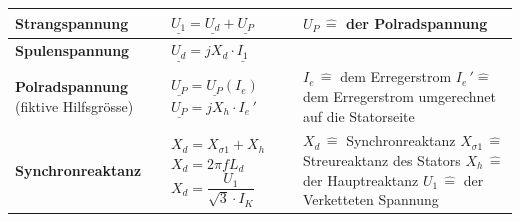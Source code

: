     \begin{longtable}[b]{| C{5cm}| P{8.5cm} | P{5 cm} |}
    	\hline
        \textbf{Strangspannung} 	&
        $\underline{U_1\!} = \underline{U_d\!} + \underline{U_P\!}$ &
        $U_P \, \widehat{=}$ der Polradspannung
        \\ \hline
        
        \textbf{Spulenspannung}	&
        $\underline{U_d} = jX_d\cdot \underline{I_1}$ &
        \\ \hline
        
        \textbf{Polradspannung} \newline (fiktive Hilfsgrösse) &
        $\underline{U_P} = \underline{U_P}\left(I_e\right)$ \newline\newline
        $\underline{U_P} = jX_h\cdot I_{e}\,'$  &
        $I_e \, \widehat{=}$ dem Erregerstrom \newline
        $I_e\,' \widehat{=}$ dem Erregerstrom umgerechnet auf die Statorseite
        \\ \hline
        
        \textbf{Synchronreaktanz} &
        $X_d = X_{\sigma 1} + X_h$ \newline \newline 
        $X_d = 2\pi f L_d$ \newline \newline
        $X_d = \dfrac{U_1}{\sqrt{3}\cdot I_K}$&
        $X_d \, \widehat{=} $ Synchronreaktanz \newline
        $X_{\sigma 1} \, \widehat{=}$ Streureaktanz des Stators \newline
        $X_h \, \widehat{=}$ der Hauptreaktanz \newline 
        $U_1\, \widehat{=}$ der Verketteten Spannung
        \\ \hline
        

\end{longtable}
